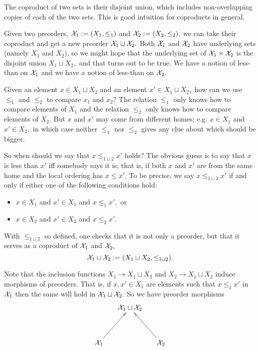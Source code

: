 \documentclass[CT4S-EN-RU]{subfiles}
\begin{document}
\begin{exampleRUS}\label{ex:[1]x[1]}
\end{exampleRUS}


\subsubsection{}

\begin{blockENG}
The coproduct of two sets is their disjoint union, which includes non-overlapping copies of each of the two sets. This is good intuition for coproducts in general.
\end{blockENG}

\begin{blockRUS}
\end{blockRUS}

\begin{exampleENG}
Given two preorders, $\mathcal{X}_1:=(X_1,\leq_1)$ and $\mathcal{X}_2:=(X_2,\leq_2),$ we can take their coproduct and get a new preorder $\mathcal{X}_1\sqcup\mathcal{X}_2.$ Both $\mathcal{X}_1$ and $\mathcal{X}_2$ have underlying sets (namely $X_1$ and $X_2$), so we might hope that the underlying set of $\mathcal{X}_1\times\mathcal{X}_2$ is the disjoint union $X_1\sqcup X_2,$ and that turns out to be true. We have a notion of less-than on $\mathcal{X}_1$ and we have a notion of less-than on $\mathcal{X}_2.$ 

Given an element $x\in X_1\sqcup X_2$ and an element $x'\in X_1\sqcup X_2,$ how can we use $\leq_1$ and $\leq_2$ to compare $x_1$ and $x_2?$ The relation $\leq_1$ only knows how to compare elements of $X_1$ and the relation $\leq_2$ only knows how to compare elements of $X_2.$ But $x$ and $x'$ may come from different homes; e.g. $x\in X_1$ and $x'\in X_2,$ in which case neither $\leq_1$ nor $\leq_2$ gives any clue about which should be bigger. 

So when should we say that $x\leq_{1\sqcup 2} x'$ holds? The obvious guess is to say that $x$ is less than $x'$ iff somebody says it is; that is, if both $x$ and $x'$ are from the same home and the local ordering has $x\leq x'.$ To be precise, we say $x\leq_{1\sqcup 2}x'$ if and only if either one of the following conditions hold:
\begin{itemize}
\item $x\in X_1$ and $x'\in X_1$ and $x\leq_1x',$ or
\item $x\in X_2$ and $x'\in X_2$ and $x\leq_2x'.$
\end{itemize}
With $\leq_{1\sqcup 2}$ so defined, one checks that it is not only a preorder, but that it serves as a coproduct of $\mathcal{X}_1$ and $\mathcal{X}_2,$ 
$$\mathcal{X}_1\sqcup\mathcal{X}_2:=(X_1\sqcup X_2,\leq_{1\sqcup 2}).$$

Note that the inclusion functions $X_1\to X_1\sqcup X_2$ and $X_2\to X_1\sqcup X_2$ induce morphisms of preorders. That is, if $x,x'\in X_1$ are elements such that $x\leq_1x'$ in $\mathcal{X}_1$ then the same will hold in $\mathcal{X}_1\sqcup\mathcal{X}_2.$ So we have preorder morphisms
$$\xymatrix@=15pt{&\mcX_1\sqcup\mcX_2\\\\\mcX_1\ar[ruu]&&\mcX_2\ar[luu]}$$
\end{exampleENG}
\end{document}
